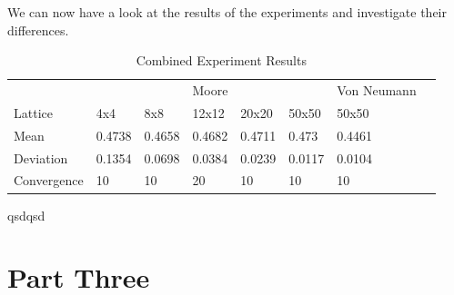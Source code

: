\documentclass[a4paper, 11pt]{article}
\begin{document}
We can now have a look at the results of the experiments and investigate their differences.

\begin{table}[H]
\centering
\caption{Combined Experiment Results}
\begin{tabular}{l|l|l|l|l|l|l|l}
            & \multicolumn{5}{c|}{Moore}                 & Von Neumann &  \\ \cline{1-7}
Lattice     & 4x4    & 8x8    & 12x12  & 20x20  & 50x50  & 50x50       &  \\ \cline{1-7}
Mean        & 0.4738 & 0.4658 & 0.4682 & 0.4711 & 0.473  & 0.4461      &  \\ \cline{1-7}
Deviation   & 0.1354 & 0.0698 & 0.0384 & 0.0239 & 0.0117 & 0.0104      &  \\ \cline{1-7}
Convergence & 10     & 10     & 20     & 10     & 10     & 10          &  \\ \cline{1-7}
\end{tabular}
\end{table}

qsdqsd



\newpage
\section{Part Three}
\end{document}
